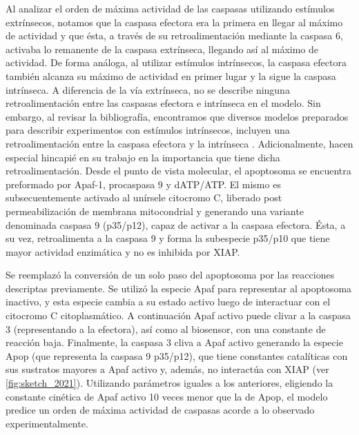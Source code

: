 Al analizar el orden de máxima actividad de las caspasas utilizando estímulos extrínsecos, notamos que la caspasa efectora era la primera en llegar al máximo de actividad y que ésta, a través de su retroalimentación mediante la caspasa 6, activaba lo remanente de la caspasa extrínseca, llegando así al máximo de actividad. De forma análoga, al utilizar estímulos intrínsecos, la caspasa efectora también alcanza su máximo de actividad en primer lugar y la sigue la caspasa intrínseca. A diferencia de la vía extrínseca, no se describe ninguna retroalimentación entre las caspasas efectora e intrínseca en el modelo. Sin embargo, al revisar la bibliografía, encontramos que diversos modelos preparados para describir experimentos con estímulos intrínsecos, incluyen una retroalimentación entre la caspasa efectora y la intrínseca \citep{Zhang2009, Rehm2006}. Adicionalmente, \cite{McComb2019} hacen especial hincapié en su trabajo en la importancia que tiene dicha retroalimentación. Desde el punto de vista molecular, el apoptosoma se encuentra preformado por Apaf-1, procaspasa 9 y dATP/ATP. El mismo es subsecuentemente activado al unírsele citocromo C, liberado post permeabilización de membrana mitocondrial y generando una variante denominada caspasa 9 (p35/p12), capaz de activar a la caspasa efectora. Ésta, a su vez, retroalimenta a la caspasa 9 y forma la subespecie p35/p10 que tiene mayor actividad enzimática y no es inhibida por XIAP.

Se reemplazó la conversión de un solo paso del apoptosoma por las reacciones descriptas previamente. Se utilizó la especie Apaf para representar al apoptosoma inactivo, y esta especie cambia a su estado activo luego de interactuar con el citocromo C citoplasmático. A continuación Apaf activo puede clivar a la caspasa 3 (representando a la efectora), así como al biosensor, con una constante de reacción baja. Finalmente, la caspasa 3 cliva a Apaf activo generando la especie Apop (que representa la caspasa 9 p35/p12), que tiene constantes catalíticas con sus sustratos mayores a Apaf activo y, además, no interactúa con XIAP (ver \cref{fig:sketch_2021}). Utilizando parámetros iguales a los anteriores, eligiendo la constante cinética de Apaf activo 10 veces menor que la de Apop, el modelo predice un orden de máxima actividad de caspasas acorde a lo observado experimentalmente.

